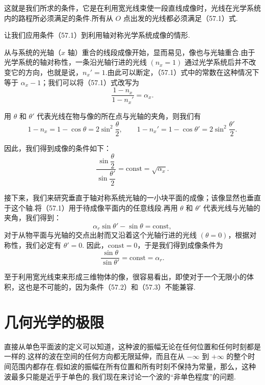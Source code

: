 这就是我们所求的条件，它是在利用宽光线束使一段直线成像时，光线在光学系统内的路程所必须满足的条件.所有从 $O$ 点出发的光线都必须满足（57.1）式.

让我们应用条件（57.1）到利用轴对称光学系统成像的情形.

从与系统的光轴（$x$ 轴）重合的线段成像开始，显而易见，像也与光轴重合.由于光学系统的轴对称性，一条沿光轴行进的光线 $(n_x=1)$ 通过光学系统后并不改变它的方向，也就是说，$n_x'=1$.由此可以断定，（57.1）式中的常数在这种情况下等于 $\alpha_x-1$；我们可以将（57.1）式改写为
\begin{equation*}
  \frac{1-n_x}{1-n_x'}=\alpha_x.
\end{equation*}

用 $\theta$ 和 $\theta'$ 代表光线在物与像的所在点与光轴的夹角，则我们有
\begin{equation*}
  1-n_x=1-\cos\theta=2\sin^2\frac{\theta}{2},\qquad
  1-n_x'=1-\cos\theta'=2\sin^2\frac{\theta'}{2}.
\end{equation*}

因此，我们得到成像的条件如下：
\begin{equation}
  \frac{\sin\dfrac{\theta}{2}}{\sin\dfrac{\theta'}{2}}
  =\mathrm{const}=\sqrt{\alpha_x}.
\end{equation}

接下来，我们来研究垂直于轴对称系统光轴的一小块平面的成像；该像显然也垂直于这个轴.将（57.1）用于待成像平面内的任意线段.再用 $\theta$ 和 $\theta'$ 代表光线与光轴的夹角，我们得到：
\begin{equation*}
  \alpha_r\sin\theta'-\sin\theta=\mathrm{const},
\end{equation*}
对于从物平面与光轴的交点出射而又沿着这个光轴行进的光线 $(\theta=0)$，根据对称性，我们必定有 $\theta'=0$. 因此，$\mathrm{const}=0$，于是我们得到成像条件为
\begin{equation}
  \frac{\sin\theta}{\sin\theta'}=\mathrm{const}=\alpha_r.
\end{equation}

至于利用宽光线束来形成三维物体的像，很容易看出，即使对于一个无限小的体积，这也是不可能的，因为条件（57.2）和（57.3）不能兼容.

\section{几何光学的极限}

直接从单色平面波的定义可以知道，这种波的振幅无论在任何位置和任何时刻都是一样的.这样的波在空间的任何方向都无限延伸，而且在从 $-\infty$ 到 $+\infty$ 的整个时间范围内都存在.假如波的振幅在所有位置和所有时刻不保持为常量，那么，这种波最多只能是近乎于单色的.我们现在来讨论一个波的“非单色程度”的问题.

